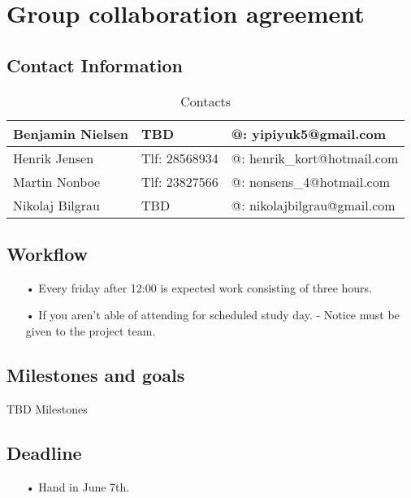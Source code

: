 \section{Group collaboration agreement}
\subsection{Contact Information}
\begin{table}[h!]
\centering
\caption{Contacts}
\label{Contact info}
\begin{tabular}{|l|l|l|}
\hline
Benjamin Nielsen & TBD           & @: yipiyuk5@gmail.com       \\ \hline
Henrik Jensen    & Tlf: 28568934 & @: henrik\_kort@hotmail.com \\ \hline
Martin Nonboe    & Tlf: 23827566 & @: nonsens\_4@hotmail.com   \\ \hline
Nikolaj Bilgrau  & TBD           & @: nikolajbilgrau@gmail.com \\ \hline
\end{tabular}
\end{table}

\subsection{Workflow}
\begin{enumerate}
	\item[•]Every friday after 12:00 is expected work consisting of three hours.   
	\item[•]If you aren’t able of attending for scheduled study day. - Notice must be given to the project team. 
\end{enumerate}

\subsection{Milestones and goals}
TBD Milestones

\subsection{Deadline}
\begin{enumerate}
	\item[•]Hand in June 7th.
\end{enumerate}
